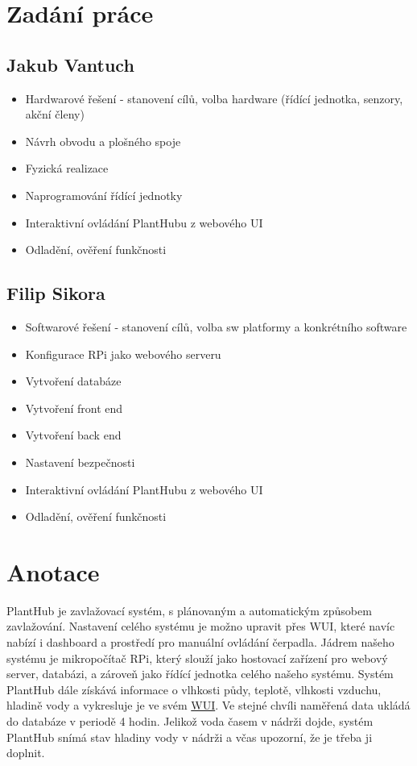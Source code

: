 \documentclass[czech,12pt,a4paper]{article}
\begin{document}
\clearpage

\section*{Zadání práce}

\subsection*{Jakub Vantuch}

\begin{itemize}
	\item Hardwarové řešení - stanovení cílů, volba hardware (řídící jednotka, senzory, akční členy)  
	\item Návrh obvodu a plošného spoje
	\item Fyzická realizace
	\item Naprogramování řídící jednotky
	\item Interaktivní ovládání PlantHubu z webového UI
	\item Odladění, ověření funkčnosti
\end{itemize}

\subsection*{Filip Sikora}

\begin{itemize}
	\item Softwarové řešení - stanovení cílů, volba sw platformy a konkrétního software  
	\item Konfigurace RPi jako webového serveru
	\item Vytvoření databáze
	\item Vytvoření front end
	\item Vytvoření back end
	\item Nastavení bezpečnosti
	\item Interaktivní ovládání PlantHubu z webového UI
	\item Odladění, ověření funkčnosti
\end{itemize}

\clearpage

\section*{Anotace}

PlantHub je zavlažovací systém, s plánovaným a automatickým způsobem zavlažování. Nastavení celého systému je možno upravit přes \ac{WUI}, které navíc nabízí i dashboard a prostředí pro manuální ovládání čerpadla. Jádrem našeho systému je mikropočítač \ac{RPi}, který slouží jako hostovací zařízení pro webový server, databázi, a zároveň jako řídící jednotka celého našeho systému. Systém PlantHub dále získává informace o vlhkosti půdy, teplotě, vlhkosti vzduchu, hladině vody a vykresluje je ve svém \underline{\ac{WUI}}. Ve stejné chvíli naměřená data ukládá do databáze v periodě 4 hodin. Jelikož voda časem v nádrži dojde, systém PlantHub snímá stav hladiny vody v nádrži a včas upozorní, že je třeba ji doplnit.
\end{document}
